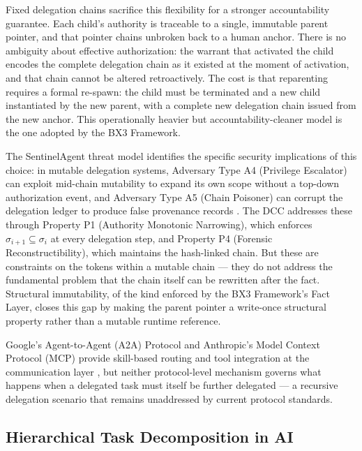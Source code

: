 Fixed delegation chains sacrifice this flexibility for a stronger accountability guarantee. Each child's authority is traceable to a single, immutable parent pointer, and that pointer chains unbroken back to a human anchor. There is no ambiguity about effective authorization: the warrant that activated the child encodes the complete delegation chain as it existed at the moment of activation, and that chain cannot be altered retroactively. The cost is that reparenting requires a formal re-spawn: the child must be terminated and a new child instantiated by the new parent, with a complete new delegation chain issued from the new anchor. This operationally heavier but accountability-cleaner model is the one adopted by the BX3 Framework.

The SentinelAgent threat model identifies the specific security implications of this choice: in mutable delegation systems, Adversary Type A4 (Privilege Escalator) can exploit mid-chain mutability to expand its own scope without a top-down authorization event, and Adversary Type A5 (Chain Poisoner) can corrupt the delegation ledger to produce false provenance records \cite[Table I]{sentinel-agent2026}. The DCC addresses these through Property P1 (Authority Monotonic Narrowing), which enforces $\sigma_{i+1} \subseteq \sigma_i$ at every delegation step, and Property P4 (Forensic Reconstructibility), which maintains the hash-linked chain. But these are constraints on the tokens within a mutable chain — they do not address the fundamental problem that the chain itself can be rewritten after the fact. Structural immutability, of the kind enforced by the BX3 Framework's Fact Layer, closes this gap by making the parent pointer a write-once structural property rather than a mutable runtime reference.

Google's Agent-to-Agent (A2A) Protocol and Anthropic's Model Context Protocol (MCP) provide skill-based routing and tool integration at the communication layer \cite{a2a2025,mcp2024}, but neither protocol-level mechanism governs what happens when a delegated task must itself be further delegated — a recursive delegation scenario that remains unaddressed by current protocol standards.

\subsection{Hierarchical Task Decomposition in AI}

